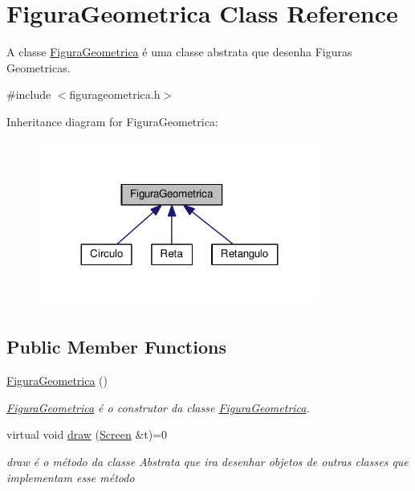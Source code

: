 \hypertarget{class_figura_geometrica}{}\section{Figura\+Geometrica Class Reference}
\label{class_figura_geometrica}


A classe \hyperlink{class_figura_geometrica}{Figura\+Geometrica} é uma classe abstrata que desenha Figuras Geometricas.  




{\ttfamily \#include $<$figurageometrica.\+h$>$}



Inheritance diagram for Figura\+Geometrica\+:
\nopagebreak
\begin{figure}[H]
\begin{center}
\leavevmode
\includegraphics[width=263pt]{class_figura_geometrica__inherit__graph}
\end{center}
\end{figure}
\subsection*{Public Member Functions}
\begin{DoxyCompactItemize}
\item 
\hyperlink{class_figura_geometrica_a81d7c7efaea511e60a15f5a363138dd9}{Figura\+Geometrica} ()
\begin{DoxyCompactList}\small\item\em \hyperlink{class_figura_geometrica}{Figura\+Geometrica} é o construtor da classe \hyperlink{class_figura_geometrica}{Figura\+Geometrica}. \end{DoxyCompactList}\item 
virtual void \hyperlink{class_figura_geometrica_a8ee8dedc060b6059a805ea091aef2c41}{draw} (\hyperlink{class_screen}{Screen} \&t)=0
\begin{DoxyCompactList}\small\item\em draw é o método da classe Abstrata que ira desenhar objetos de outras classes que implementam esse método \end{DoxyCompactList}\end{DoxyCompactItemize}



